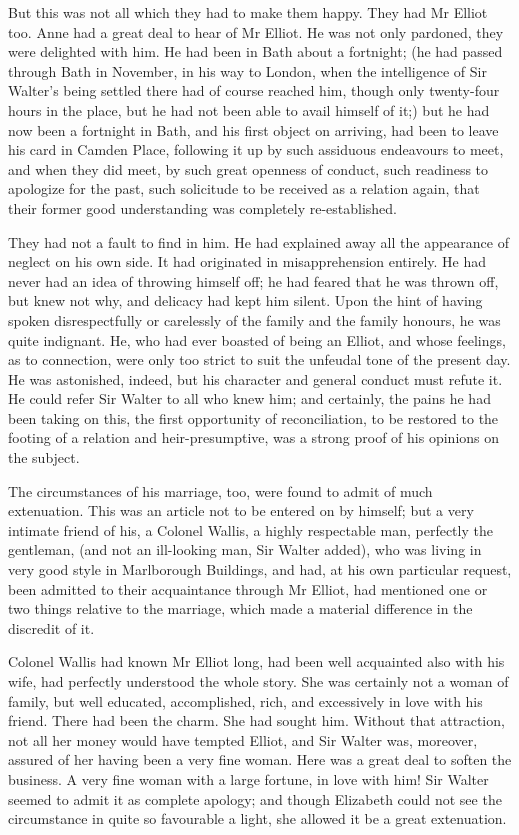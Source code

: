 But this was not all which they had to make them happy. They had Mr Elliot too. Anne had a great deal to hear of Mr Elliot. He was not only pardoned, they were delighted with him. He had been in Bath about a fortnight; (he had passed through Bath in November, in his way to London, when the intelligence of Sir Walter's being settled there had of course reached him, though only twenty-four hours in the place, but he had not been able to avail himself of it;) but he had now been a fortnight in Bath, and his first object on arriving, had been to leave his card in Camden Place, following it up by such assiduous endeavours to meet, and when they did meet, by such great openness of conduct, such readiness to apologize for the past, such solicitude to be received as a relation again, that their former good understanding was completely re-established.

They had not a fault to find in him. He had explained away all the appearance of neglect on his own side. It had originated in misapprehension entirely. He had never had an idea of throwing himself off; he had feared that he was thrown off, but knew not why, and delicacy had kept him silent. Upon the hint of having spoken disrespectfully or carelessly of the family and the family honours, he was quite indignant. He, who had ever boasted of being an Elliot, and whose feelings, as to connection, were only too strict to suit the unfeudal tone of the present day. He was astonished, indeed, but his character and general conduct must refute it. He could refer Sir Walter to all who knew him; and certainly, the pains he had been taking on this, the first opportunity of reconciliation, to be restored to the footing of a relation and heir-presumptive, was a strong proof of his opinions on the subject.

The circumstances of his marriage, too, were found to admit of much extenuation. This was an article not to be entered on by himself; but a very intimate friend of his, a Colonel Wallis, a highly respectable man, perfectly the gentleman, (and not an ill-looking man, Sir Walter added), who was living in very good style in Marlborough Buildings, and had, at his own particular request, been admitted to their acquaintance through Mr Elliot, had mentioned one or two things relative to the marriage, which made a material difference in the discredit of it.

Colonel Wallis had known Mr Elliot long, had been well acquainted also with his wife, had perfectly understood the whole story. She was certainly not a woman of family, but well educated, accomplished, rich, and excessively in love with his friend. There had been the charm. She had sought him. Without that attraction, not all her money would have tempted Elliot, and Sir Walter was, moreover, assured of her having been a very fine woman. Here was a great deal to soften the business. A very fine woman with a large fortune, in love with him! Sir Walter seemed to admit it as complete apology; and though Elizabeth could not see the circumstance in quite so favourable a light, she allowed it be a great extenuation.

